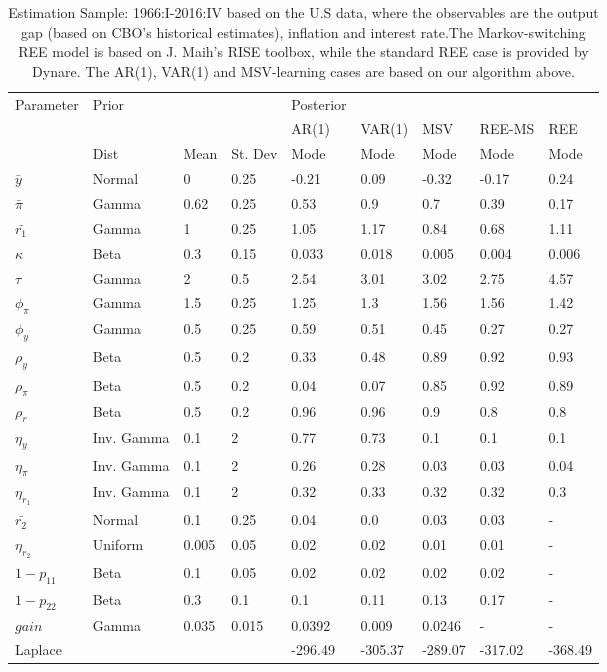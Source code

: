 \documentclass[12pt,reqno]{article}
\numberwithin{equation}{section}
\begin{document}
\begin{table}[H]
\caption{Estimation Sample: 1966:I-2016:IV based on the U.S data, where the observables are the output gap (based on CBO's historical estimates), inflation and interest rate.The Markov-switching REE model is based on J. Maih's RISE toolbox, while the standard REE case is provided by Dynare. The AR(1), VAR(1) and MSV-learning cases are based on our algorithm above. }

\vspace{3 mm}

\begin{tabular}{l||lll||l|l|l|ll}
Parameter & Prior &  &  & Posterior &  &  &  &  \\
 &  &  &  & AR(1) & VAR(1) & MSV & REE-MS & REE \\
\hline
\hline
 & Dist & Mean & St. Dev & Mode & Mode & Mode & Mode & Mode  \\
$\bar{y}$ & Normal & 0 & 0.25 & -0.21 & 0.09 & -0.32 & -0.17 & 0.24 \\
$\bar{\pi}$ & Gamma & 0.62 & 0.25 & 0.53 & 0.9 & 0.7 & 0.39 & 0.17 \\
$\bar{r_1}$ & Gamma & 1 & 0.25 & 1.05 & 1.17 & 0.84 & 0.68 & 1.11 \\
$\kappa$ & Beta & 0.3 & 0.15 & 0.033 & 0.018 & 0.005 & 0.004 & 0.006 \\
$\tau$ & Gamma & 2 & 0.5 & 2.54 & 3.01 & 3.02 & 2.75 & 4.57 \\
$\phi_{\pi}$ & Gamma & 1.5 & 0.25 & 1.25 & 1.3 & 1.56 & 1.56 & 1.42 \\
$\phi_y$ & Gamma & 0.5 & 0.25 & 0.59 & 0.51 & 0.45 & 0.27 & 0.27 \\
$\rho_y$ & Beta & 0.5 & 0.2 & 0.33 & 0.48 & 0.89 & 0.92 & 0.93 \\
$\rho_{\pi}$ & Beta & 0.5 & 0.2 & 0.04 & 0.07 & 0.85 & 0.92 & 0.89 \\
$\rho_r$ & Beta & 0.5 & 0.2 & 0.96 & 0.96 & 0.9 & 0.8 & 0.8 \\
$\eta_y$ & Inv. Gamma & 0.1 & 2 & 0.77 & 0.73 & 0.1 & 0.1 & 0.1 \\
$\eta_{\pi}$ & Inv. Gamma & 0.1 & 2 & 0.26 & 0.28 & 0.03 & 0.03 & 0.04 \\
$\eta_{r_1}$ & Inv. Gamma & 0.1 & 2 & 0.32 & 0.33 & 0.32 & 0.32 & 0.3 \\
$\bar{r_2}$ & Normal & 0.1 & 0.25 & 0.04 & 0.0 & 0.03 & 0.03 & - \\
$\eta_{r_2}$ & Uniform & 0.005 & 0.05 & 0.02 & 0.02 & 0.01 & 0.01 & - \\
$1-p_{11}$ & Beta & 0.1 & 0.05 & 0.02 & 0.02 & 0.02 & 0.02 & - \\
$1-p_{22}$ & Beta & 0.3 & 0.1 & 0.1 & 0.11 & 0.13 & 0.17 & - \\
$gain$ & Gamma & 0.035 & 0.015 & 0.0392 & 0.009 & 0.0246 & - & - \\
 \hline
\hline
Laplace &  &  &  & -296.49 & -305.37 & -289.07  & -317.02 & -368.49
\end{tabular}
\end{table}
\end{document}
